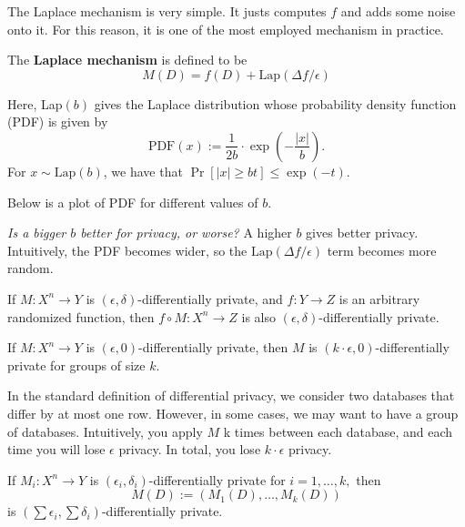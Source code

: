 The Laplace mechanism is very simple. It justs computes $f$ and adds some noise onto it. For this reason, it is one of the most employed mechanism in practice.

\begin{definition}
    The \textbf{Laplace mechanism} is defined to be
    $$M(D) = f(D) + \text{Lap}(\Delta f / \epsilon)$$
\end{definition}

Here, Lap$(b)$ gives the Laplace distribution whose probability density function (PDF) is given by 
$$\text{PDF}(x) := \frac{1}{2b} \cdot \exp\left(-\frac{|x|}{b}\right).$$
For $x \sim \text{Lap}(b)$, we have that $\Pr [|x| \geq bt] \leq \exp (-t)$.

Below is a plot of PDF for different values of $b$.

\begin{center}
    \def\svgwidth{0.5\linewidth}
    
\end{center}

\textit{Is a bigger $b$ better for privacy, or worse?} A higher $b$ gives better privacy. Intuitively, the PDF becomes wider, so the $\text{Lap}(\Delta f / \epsilon)$ term becomes more random.

\begin{theorem}
    If $M: X^n \to Y$ is $(\epsilon, \delta)$-differentially private, and $f:Y\to Z$ is an arbitrary randomized function, then $f\circ M : X^n \to Z$ is also $(\epsilon, \delta)$-differentially private.
\end{theorem}

\begin{theorem}
    If $M: X^n \to Y$ is $(\epsilon, 0)$-differentially private, then $M$ is $(k\cdot \epsilon, 0)$-differentially private for groups of size $k$.

    In the standard definition of differential privacy, we consider two databases that differ by at most one row. However, in some cases, we may want to have a group of databases. Intuitively, you apply $M$ k times between each database, and each time you will lose $\epsilon$ privacy. In total, you lose $k \cdot \epsilon$ privacy.
\end{theorem}

\begin{theorem}[Composition]
    If $M_i: X^n \to Y$ is $(\epsilon_i, \delta_i)$-differentially private for $i = 1, \dots, k,$ then
    $$M(D) := (M_1(D), \dots, M_k(D))$$
    is $(\sum \epsilon_i, \sum \delta_i)$-differentially private.
\end{theorem}

